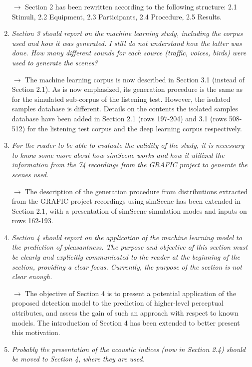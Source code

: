 \documentclass[10pt]{article}
\begin{document}
\begin{enumerate}
$\rightarrow$ Section 2 has been rewritten according to the following structure: 2.1 Stimuli, 2.2 Equipment, 2.3 Participants, 2.4 Procedure, 2.5 Results.

\item \emph{Section 3 should report on the machine learning study, including the corpus used and how it was generated. I still do not understand how the latter was done. How many different sounds for each source (traffic, voices, birds) were used to generate the scenes?}

$\rightarrow$ The machine learning corpus is now described in Section 3.1 (instead of Section 2.1). As is now emphasized, its generation procedure is the same as for the simulated sub-corpus of the listening test. However, the isolated samples database is different. Details on the contents the isolated samples database have been added in Section 2.1 (rows 197-204) and 3.1 (rows 508-512) for the listening test corpus and the deep learning corpus respectively.

\item \emph{For the reader to be able to evaluate the validity of the study, it is necessary to know some more about how simScene works and how it utilized the information from the 74 recordings from the GRAFIC project to generate the scenes used.}

$\rightarrow$ The description of the generation procedure from distributions extracted from the GRAFIC project recordings using simScene has been extended in Section 2.1, with a presentation of simScene simulation modes and inputs on rows 162-193.

\item \emph{Section 4 should report on the application of the machine learning model to the prediction of pleasantness. The purpose and objective of this section must be clearly and explicitly communicated to the reader at the beginning of the section, providing a clear focus. Currently, the purpose of the section is not clear enough.}

$\rightarrow$ The objective of Section 4 is to present a potential application of the proposed detection model to the prediction of higher-level perceptual attributes, and assess the gain of such an approach with respect to known models. The introduction of Section 4 has been extended to better present this motivation.

\item \emph{Probably the presentation of the acoustic indices (now in Section 2.4) should be moved to Section 4, where they are used.}


\end{enumerate}
\end{document}
